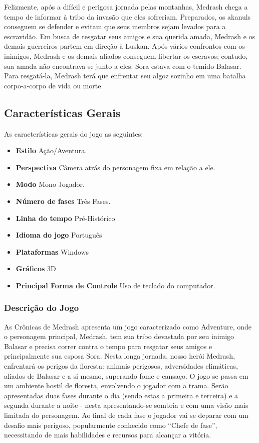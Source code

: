 Felizmente, após a difícil e perigosa jornada pelas montanhas, Medrash 
chega a tempo de informar à tribo da invasão que eles sofreriam. Preparados,
 os akanuls conseguem se defender e evitam que seus membros sejam levados
 para a escravidão. Em busca de resgatar seus amigos e sua querida amada, 
Medrash e os demais guerreiros partem em direção à Luskan. Após vários
 confrontos com os inimigos, Medrash e os demais aliados 
conseguem libertar os escravos; contudo, sua amada não encontrava-se junto 
a eles: Sora estava com o temido Balasar. Para resgatá-la, Medrash terá que
 enfrentar seu algoz sozinho em uma batalha corpo-a-corpo de vida ou morte.

\subsection{Características Gerais}
As características gerais do jogo as seguintes: 
\begin{itemize}
\item {\bf Estilo}
Ação/Aventura. 
\item{\bf Perspectiva}
Câmera atrás do personagem fixa em relação a ele.
\item{\bf Modo}
Mono Jogador.
\item{\bf Número de fases}
Três Fases.
\item{ \bf Linha do tempo}
Pré-Histórico 
\item{ \bf Idioma do jogo}
Português
\item{ \bf Plataformas}
Windows
\item{\bf Gráficos}
3D
\item{ \bf Principal Forma de Controle}
Uso de teclado do computador.
\end{itemize}

\subsubsection{Descrição do Jogo}
As Crônicas de Medrash apresenta um jogo caracterizado como Adventure,
 onde o personagem principal, Medrash, tem sua tribo devastada por seu inimigo 
Balasar e precisa correr contra o tempo para resgatar seus amigos e 
principalmente sua esposa Sora.
Nesta longa jornada, nosso herói Medrash, enfrentará os perigos da floresta: 
animais perigosos, adversidades climáticas, aliados de Balasar e a si mesmo, 
superando fome e cansaço.
O jogo se passa em um ambiente hostil de floresta, envolvendo o jogador com a 
trama. Serão apresentadas duas fases durante o dia (sendo estas a primeira e terceira)
 e a segunda durante a noite - nesta apresentando-se sombria e com uma visão 
mais limitada do personagem. Ao final de cada fase o jogador vai se deparar com 
um desafio mais perigoso, popularmente conhecido como ``Chefe de fase'', necessitando 
de mais habilidades e recursos para alcançar a vitória.

